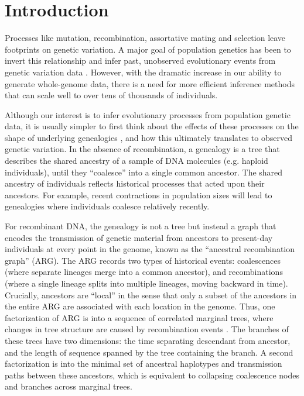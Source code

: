\section{Introduction}

Processes like mutation, recombination, assortative mating and selection leave footprints on genetic variation.
A major goal of population genetics has been to invert this relationship and infer past, unobserved evolutionary events from genetic variation data \citep{schraiber_methods_2015}.
However, with the dramatic increase in our ability to generate whole-genome data,
there is a need for more efficient inference methods that can scale well to over tens of thousands of individuals.

Although our interest is to infer evolutionary processes from population genetic data,
it is usually simpler to first think about the effects of these processes on the shape of underlying genealogies \citep{wakely_coalescent_2016},
and how this ultimately translates to observed genetic variation.
In the absence of recombination,
a genealogy is a tree that describes the shared ancestry of a sample of DNA molecules (e.g. haploid individuals),
until they ``coalesce'' into a single common ancestor.
The shared ancestry of individuals reflects historical processes that acted upon their ancestors. 
For example, recent contractions in population sizes will lead to genealogies where individuals coalesce relatively recently.

For recombinant DNA,
the genealogy is not a tree but instead a graph that encodes the transmission of genetic material from ancestors to present-day individuals at every point in the genome,
known as the ``ancestral recombination graph'' (ARG).
The ARG records two types of historical events:
coalescences (where separate lineages merge into a common ancestor),
and recombinations (where a single lineage splits into multiple lineages, moving backward in time).
Crucially, ancestors are ``local'' in the sense that only a subset of the ancestors in the entire ARG are associated with each location in the genome.
Thus, one factorization of ARG is into a sequence of correlated marginal trees,
where changes in tree structure are caused by recombination events \citep{kelleher_efficient_2016, kelleher_inferring_2019}.
The branches of these trees have two dimensions:
the time separating descendant from ancestor,
and the length of sequence spanned by the tree containing the branch.
A second factorization is into the minimal set of ancestral haplotypes and transmission paths between these ancestors,
which is equivalent to collapsing coalescence nodes and branches across marginal trees. 

